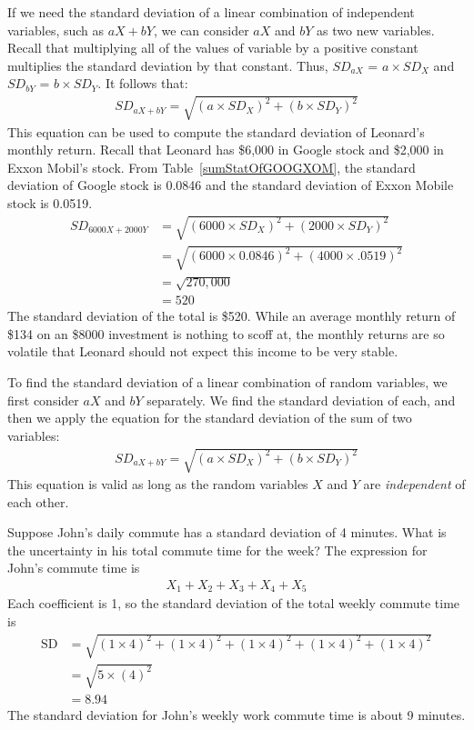 If we need the standard deviation of a linear combination of independent variables, such as $aX + bY$, we can consider $aX$ and $bY$ as two new variables. Recall that multiplying all of the values of variable by a positive constant multiplies the standard deviation by that constant. Thus, $SD_{aX}$ =  $a \times SD_X$ and $SD_{bY}$ =  $b \times SD_Y$. It follows that:
\begin{align*}
SD_{aX + bY} = \sqrt{(a \times SD_X)^2 + (b \times SD_Y)^2}
\end{align*}
This equation can be used to compute the standard deviation of Leonard's monthly return. Recall that Leonard has \$6,000 in Google stock and \$2,000 in Exxon Mobil's stock. From Table~\ref{sumStatOfGOOGXOM}, the standard deviation of Google stock is 0.0846 and the standard deviation of Exxon Mobile stock is 0.0519.
\begin{align*}
SD_{6000X + 2000Y}
	&= \sqrt{(6000\times SD_X)^2 + (2000\times SD_Y)^2} \\
	&= \sqrt{(6000\times 0.0846)^2 + (4000\times .0519)^2} \\
	&= \sqrt{270,000} \\
	&= 520
\end{align*}
The standard deviation of the total is \$520. While an average monthly return of \$134 on an \$8000 investment is nothing to scoff at, the monthly returns are so volatile that Leonard should not expect this income to be very stable.

\begin{termBox}{
To find the standard deviation of a linear combination of random variables, we first consider $aX$ and $bY$ separately. We find the standard deviation of each, and then we apply the equation for the standard deviation of the sum of two variables:
\begin{align*}
SD_{aX + bY} = \sqrt{(a\times SD_X)^2 + (b\times SD_Y)^2}
\end{align*}
This equation is valid as long as the random variables $X$ and $Y$ are \emph{independent} of each other.}
\end{termBox}

\begin{example}{Suppose John's daily commute has a standard deviation of 4 minutes. What is the uncertainty in his total commute time for the week?} \label{sdOfJohnsCommuteWeeklyTime}
The expression for John's commute time is
\begin{align*}
X_1 + X_2 + X_3 + X_4 + X_5
\end{align*}
Each coefficient is 1, so the standard deviation of the total weekly commute time is
\begin{align*}
\text{SD}&= \sqrt{(1 \times 4)^2 + (1 \times 4)^2 + (1 \times 4)^2 + (1 \times 4)^2 + (1 \times 4)^2} \\
&= \sqrt{5\times (4)^2} \\
&= 8.94
\end{align*}
The standard deviation for John's weekly work commute time is about 9 minutes.
\end{example}

